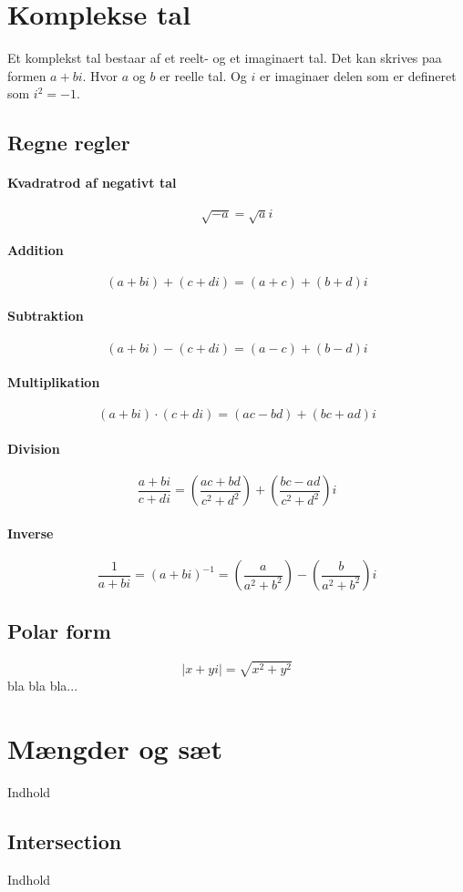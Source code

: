 \documentclass[a4paper]{article}
\begin{document}
\section{Komplekse tal}
 Et komplekst tal bestaar af et reelt- og et imaginaert tal. Det kan skrives paa formen $a + bi$. Hvor $a$ og $b$ er reelle tal. Og $i$ er imaginaer delen som er defineret som $i^2 = -1$.
 \subsection{Regne regler}
  \paragraph{Kvadratrod af negativt tal}
   $$\sqrt{-a} = \sqrt{a}i$$
  \paragraph{Addition}
   $$(a + bi) + (c + di) = (a + c) + (b + d)i$$
  \paragraph{Subtraktion}
   $$(a + bi) - (c + di) = (a - c) + (b - d)i$$
  \paragraph{Multiplikation}
   $$(a + bi) \cdot (c + di) = (ac - bd) + (bc + ad)i$$
  \paragraph{Division}
   $$\frac{a + bi}{c + di} = \left(\frac{ac + bd}{c^2 + d^2}\right) + \left(\frac{bc - ad}{c^2 + d^2}\right)i$$
  \paragraph{Inverse} %
   $$\frac{1}{a + bi} = (a + bi)^{-1} = \left(\frac{a}{a^2 + b^2}\right) - \left(\frac{b}{a^2 + b^2}\right)i$$
 \subsection{Polar form}
  $$|x + yi| = \sqrt{x^2 + y^2}$$
  bla bla bla...


\section{Mængder og sæt}
  Indhold
  \subsection{Intersection}
    Indhold
\end{document}
